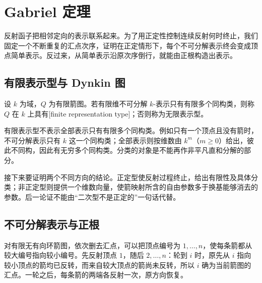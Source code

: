 \section{Gabriel 定理}
\label{b5:sec:1003}

反射函子把相邻定向的表示联系起来。为了用正定性控制连续反射何时终止，我们固定一个不断重复的汇点次序，证明在正定情形下，每个不可分解表示终会变成顶点简单表示。反过来，从简单表示沿原次序倒行，就能由正根构造出表示。

\subsection{有限表示型与 Dynkin 图}
\label{b5:subsec:1003:01}

\begin{definition}\label{b5:def:finite-quiver-type}
	设 \(k\) 为域，\(Q\) 为有限箭图。若有限维不可分解 \(k\)-表示只有有限多个同构类，则称 \(Q\) 在 \(k\) 上具有[finite representation type]；否则称为无限表示型。
\end{definition}

有限表示型不表示全部表示只有有限多个同构类。例如只有一个顶点且没有箭时，不可分解表示只有 \(k\) 这一个同构类；全部表示则按维数由 \(k^m\)（\(m\geq0\)）给出，彼此不同构，因此有无穷多个同构类。分类的对象是不能再作非平凡直和分解的部分。

\ProseParagraphBreak

接下来要证明两个不同方向的结论。正定型使反射过程终止，给出有限性及具体分类；非正定型则提供一个维数向量，使箭映射所含的自由参数多于换基能够消去的参数。后一论证不能由“二次型不是正定的”一句话代替。

\subsection{不可分解表示与正根}
\label{b5:subsec:1003:02}

对有限无有向环箭图，依次删去汇点，可以把顶点编号为 \(1,\ldots,n\)，使每条箭都从较大编号指向较小编号。先反射顶点 \(1\)，随后 \(2,\ldots,n\)：轮到 \(i\) 时，原先从 \(i\) 指向较小顶点的箭均已反转，而来自较大顶点的箭尚未反转，所以 \(i\) 确为当前箭图的汇点。一轮之后，每条箭的两端各反射一次，原方向恢复。

